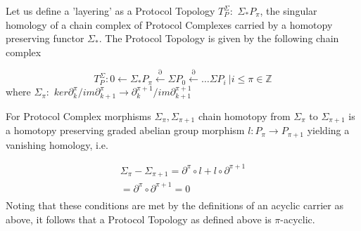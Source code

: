\documentclass[runningheads]{llncs}
\begin{document}
Let us define a 'layering' as a Protocol Topology $T^{\Sigma}_P: $ $\Sigma_{*}P_\pi$, the singular homology of a chain complex of Protocol Complexes carried by a homotopy preserving functor $\Sigma_*$. The Protocol Topology is given by the following chain complex

\begin{equation}
T^{\Sigma}_P: 0 \leftarrow \Sigma_{*}P_\pi \xleftarrow{\partial} \Sigma P_{0} \xleftarrow{\partial} \dots \Sigma P_i \ | i \leq \pi \in \mathbb{Z}
\end{equation}
where $\Sigma_\pi: $ $ker \partial^{\pi}_{k}/im \partial^{\pi}_{k+1} \rightarrow \partial^{\pi+1}_{k} /im \partial^{\pi+1}_{k+1}$ 

For Protocol Complex morphisms $\Sigma_\pi, \Sigma_{\pi+1}$ chain homotopy from $\Sigma_\pi$ to $\Sigma_{\pi+1}$ is a homotopy preserving graded abelian group morphism $l: P_{\pi} \rightarrow P_{\pi+1}$ yielding a vanishing homology, i.e. 

\begin{equation}
\begin{split}
\Sigma_\pi - \Sigma_{\pi+1} =  \partial^{\pi}\circ l + l \circ \partial^{\pi+1} \\
= \partial^\pi \circ \partial^{\pi+1} = 0 \\
\end{split}
\end{equation}
Noting that these conditions are met by the definitions of an acyclic carrier as above, it follows that a Protocol Topology as defined above is $\pi$-acyclic.
 
\end{document}

